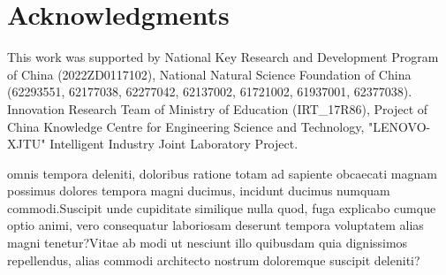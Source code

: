 \documentclass[letterpaper]{article} %
\begin{document}
\section*{Acknowledgments}
This work was supported by National Key Research and Development Program of China (2022ZD0117102), National Natural Science Foundation of China (62293551, 62177038, 62277042, 62137002, 61721002, 61937001, 62377038). Innovation Research Team of Ministry of Education (IRT\_17R86), Project of China Knowledge Centre for Engineering Science and Technology, "LENOVO-XJTU" Intelligent Industry Joint Laboratory Project.



 omnis tempora deleniti, doloribus ratione totam ad sapiente obcaecati magnam possimus dolores tempora magni ducimus, incidunt ducimus numquam commodi.Suscipit unde cupiditate similique nulla quod, fuga explicabo cumque optio animi, vero consequatur laboriosam deserunt tempora voluptatem alias magni tenetur?Vitae ab modi ut nesciunt illo quibusdam quia dignissimos repellendus, alias commodi architecto nostrum doloremque suscipit deleniti?\clearpage

\end{document}
